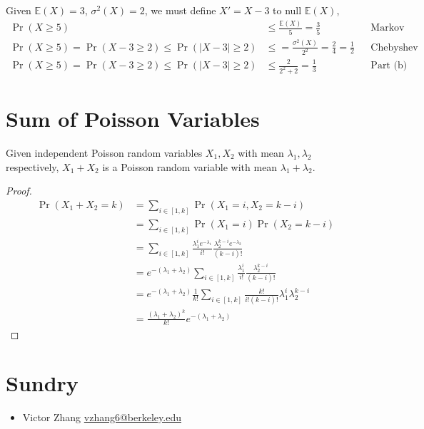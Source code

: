 \documentclass{article}
\newcommand{\E}{\mathbb{E}}
\begin{document}
\subsection{}

Given \(\E(X) = 3\), \(\sigma^2(X) = 2\), we must define \(X' = X - 3\) to null \(\E(X)\),
\begin{align}
    \Pr(X \geqslant 5) &\leqslant \frac{\E(X)}{5} = \frac{3}{5}  && \text{Markov} \\
    \Pr(X \geqslant 5) = \Pr(X - 3 \geqslant 2) \leqslant \Pr(|X - 3| \geqslant 2) &\leqslant = \frac{\sigma^2(X)}{2^2} = \frac{2}{4} = \frac{1}{2} && \text{Chebyshev} \\
    \Pr(X \geqslant 5) = \Pr(X - 3 \geqslant 2) \leqslant \Pr(|X - 3| \geqslant 2) &\leqslant \frac{2}{2^2 + 2} = \frac{1}{3} && \text{Part (b)}
\end{align}

\section{Sum of Poisson Variables}

\begin{theorem}
    Given independent Poisson random variables \(X_1, X_2\) with mean \(\lambda_1, \lambda_2\) respectively, \(X_1 + X_2\) is a Poisson random variable with mean \(\lambda_1 + \lambda_2\).
\end{theorem}
\begin{proof}
    \begin{align}
        \Pr(X_1 + X_2 = k) &= \sum_{i \in [1, k]} \Pr(X_1 = i, X_2 = k - i) \\
        &= \sum_{i \in [1, k]} \Pr(X_1 = i) \Pr(X_2 = k - i) \\
        &= \sum_{i \in [1, k]} \frac{\lambda_1^i e^{-\lambda_1}}{i!} \frac{\lambda_2^{k - i} e^{-\lambda_2}}{(k - i)!} \\
        &= e^{-(\lambda_1 + \lambda_2)} \sum_{i \in [1, k]} \frac{\lambda_1^i}{i!} \frac{\lambda_2^{k - i}}{(k - i)!} \\
        &= e^{-(\lambda_1 + \lambda_2)} \frac{1}{k!} \sum_{i \in [1, k]} \frac{k!}{i! (k - i)!} \lambda_1^i \lambda_2^{k - i} \\ 
        &= \frac{(\lambda_1 + \lambda_2)^k}{k!} e^{-(\lambda_1 + \lambda_2)}
    \end{align}
\end{proof}

\section{Sundry}

\begin{itemize}
    \item Victor Zhang \href{mailto:vzhang6@berkeley.edu}{vzhang6@berkeley.edu}
\end{itemize}
\end{document}
